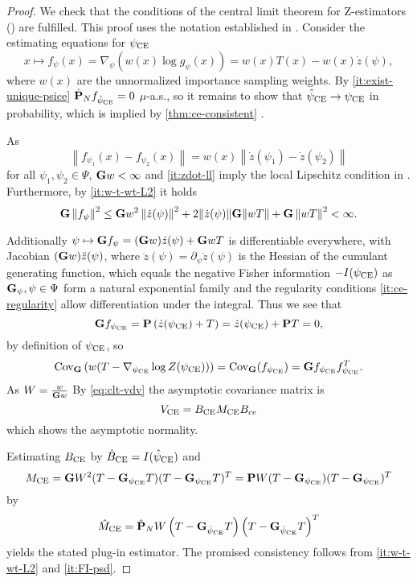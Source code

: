 \begin{proof} We check that the conditions of the central limit theorem for Z-estimators () are fulfilled. This proof uses the notation established in . Consider the estimating equations for ${\psi_{\text{CE}}}$ 
    $$x\mapsto f_\psi(x) = \nabla_{\psi} \left(w(x)\log g_{\psi}(x)\right) = w(x) T(x) - w(x) \dot z (\psi),$$ where $w(x)$ are the unnormalized importance sampling weights. 
    By \ref{it:exist-unique-psice} $\hat {\mathbf P}_{N} f_{{\hat\psi_{\text{CE}}}} = 0$ $\mu$-a.s., so it remains to show that ${\hat\psi_{\text{CE}}} \to {\ensuremath{\psi_{\text{CE}}}}$  in probability, which is implied by \cref{thm:ce-consistent} .
    
    As $$\left\lVert f_{\psi_1}(x) - f_{\psi_2}(x)\right\rVert = w(x) \left\lVert \dot z (\psi_1) - \dot z(\psi_2)\right\rVert$$ for all $\psi_{1}, \psi_{2}\in \Psi$,  $\mathbf G w < \infty $ and \ref{it:zdot-ll} imply the local Lipschitz condition  in .
    Furthermore, by \ref{it:w-t-wt-L2} it holds
    $$
    \mathbf G \left\lVert f_\psi \right\rVert^2 \leq \mathbf G w^2 \left\lVert \dot z(\psi) \right\rVert ^2  + 2 \lVert \dot z(\psi) \rVert \mathbf G \lVert wT\rVert + \mathbf G \left\lVert wT\right\rVert^2 < \infty.
    $$

    Additionally $\psi \mapsto\mathbf G f_\psi = (\mathbf G w) \dot z (\psi) + \mathbf G wT$ is differentiable everywhere, with Jacobian $(\mathbf G w) \ddot z(\psi)$, where  $\ddot z(\psi) = \partial_\psi \dot z(\psi)$ is the Hessian of the cumulant generating function, which equals the negative Fisher information $-I({\psi_{\text{CE}}})$ as $\mathbf G_{\psi}, \psi \in \Psi$ form a natural exponential family and the regularity conditions \ref{it:ce-regularity} allow differentiation under the integral.
    Thus we see that 
    $$
    \mathbf G f_{{\psi_{\text{CE}}}} = \mathbf P \left( \dot z({\psi_{\text{CE}}}) + T \right) = \dot z ({\psi_{\text{CE}}}) + \mathbf P T = 0,
    $$
    by definition of ${\psi_{\text{CE}}}$, so $$\text{Cov}_{\mathbf G} \left( w(T - \nabla_{{\psi_{\text{CE}}}} \log Z ({\psi_{\text{CE}}})) \right) = \text{Cov}_{\mathbf G}(f_{{\psi_{\text{CE}}}}) = \mathbf G f_{{\psi_{\text{CE}}}}f_{{\psi_{\text{CE}}}}^{T}.$$
    As $W = \frac{w}{\mathbf G w}$
    By \cref{eq:clt-vdv} the asymptotic covariance matrix is 
    $$
    V_{{\text{CE}}} = B_{{\text{CE}}}M_{{\text{CE}}}B_{ce}
    $$
    which shows the asymptotic normality. 

    Estimating $B_{{\text{CE}}}$ by $\hat B_{{\text{CE}}}= I({\hat\psi_{\text{CE}}})$ and $$M_{{\text{CE}}} = \mathbf G W^{2} (T - \mathbf G_{{\psi_{\text{CE}}}}T)(T - \mathbf G_{{\psi_{\text{CE}}}}T)^{T} = \mathbf P W (T - \mathbf G_{{\psi_{\text{CE}}}})(T - \mathbf G_{{\psi_{\text{CE}}}})^T$$ by $$\hat M_{{\text{CE}}} = \hat{\mathbf P}_{N} W \left( T - \mathbf G_{{\hat\psi_{\text{CE}}}} T \right)\left( T - \mathbf G_{{\hat\psi_{\text{CE}}}} T \right)^{T}$$
    yields the stated plug-in estimator. 
    The promised consistency follows from \ref{it:w-t-wt-L2} and \ref{it:FI-psd}.
\end{proof}

